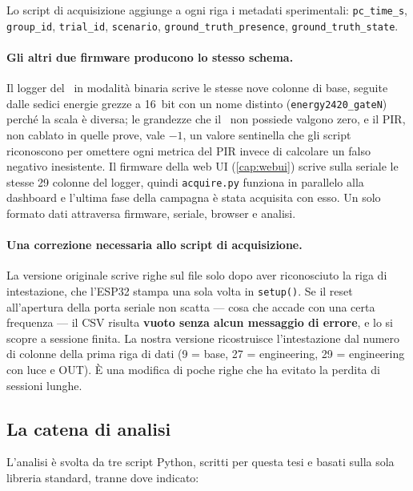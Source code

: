 Lo script di acquisizione aggiunge a ogni riga i metadati sperimentali:
\texttt{pc\_time\_s}, \texttt{group\_id}, \texttt{trial\_id}, \texttt{scenario},
\texttt{ground\_truth\_presence}, \texttt{ground\_truth\_state}.

\paragraph{Gli altri due firmware producono lo stesso schema.} Il logger del \ldc\
in modalità binaria scrive le stesse nove colonne di base, seguite dalle sedici
energie grezze a 16~bit con un nome distinto (\texttt{energy2420\_gateN}) perché la
scala è diversa; le grandezze che il \ldc\ non possiede valgono zero, e il PIR, non
cablato in quelle prove, vale $-1$, un valore sentinella che gli script riconoscono
per omettere ogni metrica del PIR invece di calcolare un falso negativo inesistente.
Il firmware della web UI (\cref{cap:webui}) scrive sulla seriale le stesse 29
colonne del logger, quindi \texttt{acquire.py} funziona in parallelo alla dashboard
e l'ultima fase della campagna è stata acquisita con esso. Un solo formato dati
attraversa firmware, seriale, browser e analisi.

\paragraph{Una correzione necessaria allo script di acquisizione.} La versione
originale scrive righe sul file solo dopo aver riconosciuto la riga di intestazione,
che l'ESP32 stampa una sola volta in \texttt{setup()}. Se il reset all'apertura
della porta seriale non scatta --- cosa che accade con una certa frequenza --- il
CSV risulta \textbf{vuoto senza alcun messaggio di errore}, e lo si scopre a
sessione finita. La nostra versione ricostruisce l'intestazione dal numero di
colonne della prima riga di dati (9 = base, 27 = engineering, 29 = engineering con
luce e OUT). È una modifica di poche righe che ha evitato la perdita di sessioni
lunghe.

\subsection{La catena di analisi}
\label{sec:catena-analisi}

L'analisi è svolta da tre script Python, scritti per questa tesi e basati sulla
sola libreria standard, tranne dove indicato:

